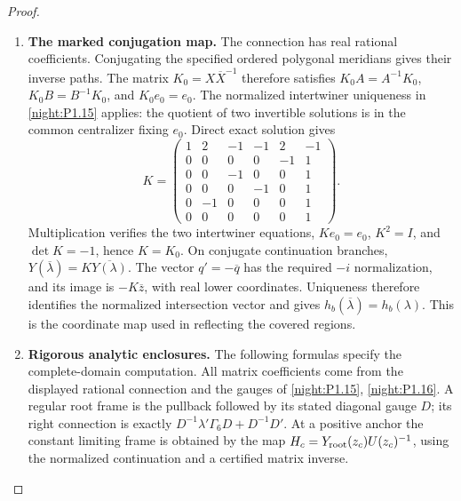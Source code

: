 \begin{proof}
\begin{enumerate}[label={$\langle1\rangle$\arabic*.}]
\item \textbf{The marked conjugation map.}
The connection has real rational coefficients. Conjugating the
specified ordered polygonal meridians gives their inverse paths.
The matrix $K_0=X\overline X^{-1}$ therefore satisfies
$K_0A=A^{-1}K_0$, $K_0B=B^{-1}K_0$, and $K_0e_0=e_0$.
The normalized intertwiner uniqueness in \cref{night:P1.15}
applies: the quotient of two invertible solutions is in the
common centralizer fixing $e_0$. Direct exact solution gives
\[
 K=\begin{pmatrix}
 1&2&-1&-1&2&-1\\
 0&0&0&0&-1&1\\
 0&0&-1&0&0&1\\
 0&0&0&-1&0&1\\
 0&-1&0&0&0&1\\
 0&0&0&0&0&1
 \end{pmatrix}.
\]
Multiplication verifies the two intertwiner equations,
$Ke_0=e_0$, $K^2=I$, and $\det K=-1$, hence $K=K_0$.
On conjugate continuation branches,
$Y(\overline\lambda)=K\overline{Y(\lambda)}$.
The vector $q'=-\overline q$ has the required $-i$ normalization,
and its image is $-K\overline z$, with real lower coordinates.
Uniqueness therefore identifies the normalized intersection
vector and gives
$h_b(\overline\lambda)=h_b(\lambda)$.
This is the coordinate map used in reflecting the covered
regions.

\item \textbf{Rigorous analytic enclosures.}
The following formulas specify the complete-domain computation.
All matrix coefficients come from the displayed rational
connection and the gauges of
\cref{night:P1.15}, \cref{night:P1.16}. A regular root frame is the
pullback followed by its stated diagonal gauge $D$; its right
connection is exactly
$D^{-1}\lambda'\Gamma_6D+D^{-1}D'$.
At a positive anchor the constant limiting frame is obtained by
the map $H_c=Y_{\rm root}(z_c)U(z_c)^{-1}$, using the
normalized continuation and a certified matrix inverse.



\end{enumerate}
\end{proof}
